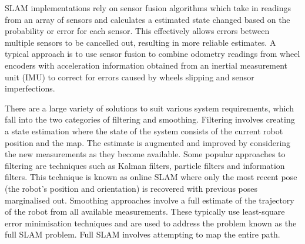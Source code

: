 SLAM implementations rely on sensor fusion algorithms which take in readings from an
array of sensors and calculates a estimated state changed based on the probability
or error for each sensor. This effectively allows errors between multiple sensors
to be cancelled out, resulting in more reliable estimates. A typical approach is to
use sensor fusion to combine odometry readings from wheel encoders with acceleration
information obtained from an inertial measurement unit (IMU) to correct for errors
caused by wheels slipping and sensor imperfections.

There are a large variety of solutions to suit various system requirements, which
fall into the two categories of filtering and smoothing. Filtering
involves creating a state estimation where the state of the system consists of
the current robot position and the map. The estimate is augmented and improved
by considering the new measurements as they become available. Some popular
approaches to filtering are techniques such as Kalman filters, particle filters
and information filters. This technique is known as online SLAM where only the most
recent pose (the robot's position and orientation) is recovered with previous poses
marginalised out. Smoothing approaches involve a full estimate of the trajectory of
the robot from all available
measurements. These typically use least-square error minimisation techniques and are
used to address the problem known as the full SLAM problem. Full SLAM involves
attempting to map the entire path.

